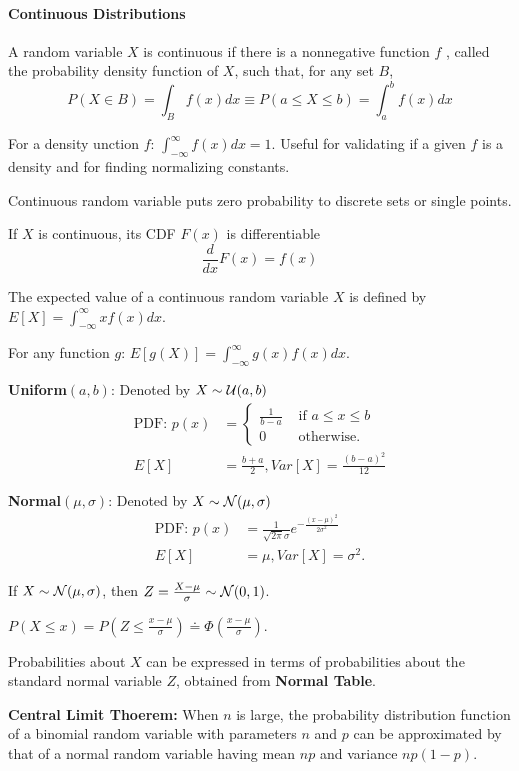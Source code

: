 \documentclass[10pt,twocolumn]{article}
\numberwithin{equation}{section}
\begin{document}
\paragraph{Continuous Distributions}
\ben 
\item A random variable $X$ is continuous if there is a nonnegative function $f$ , called the probability density function of $X$, such that, for any set $B$,
\[
P( X \in B) = \int_B f(x) dx \equiv P(a \le X \le b) = \int_{a}^{b} f(x) dx
\]
\item For a density unction $f$: $\int_{-\infty}^{\infty} f(x) dx = 1$. Useful for validating if a given $f$ is a density and for finding normalizing constants. 
\item Continuous random variable puts zero probability to discrete sets or single points. 
\item If $X$ is continuous, its CDF $F(x)$ is differentiable
\[
\frac{d}{dx}F(x) = f(x) 
\]
\item The expected value of a continuous random variable $X$ is defined by
$E[X] = \int_{-\infty}^{\infty} xf(x) dx$.
\item For any function $g$: $E[g(X)] = \int_{-\infty}^{\infty} g(x) f(x) dx$. 
\item \textbf{Uniform$(a,b)$}: Denoted by $X \sim \mathcal{U}(a,b)$
\begin{align*}
\text{PDF: } p(x) &= \begin{cases} \frac{1}{b-a} &\text{ if } a \le x \le b \\
0 &\text{ otherwise}.
\end{cases} \\
E[X] & = \frac{b+a}{2}, Var[X] = \frac{(b-a)^2}{12} 
\end{align*}
\item \textbf{Normal$(\mu,\sigma)$}: Denoted by $X \sim \mathcal{N}(\mu,\sigma)$
\begin{align*}
\text{PDF: } p(x) &= \frac{1}{\sqrt{2\pi} \sigma} e^{-\frac{(x-\mu)^2}{2\sigma^2}} \\
E[X] & = \mu, Var[X] = \sigma^2. 
\end{align*}
\item If $X \sim \mathcal{N}(\mu,\sigma)$, then $Z = \frac{X-\mu}{\sigma} \sim \mathcal{N}(0,1)$. 
\item $P(X \le x) = P(Z \le \frac{x-\mu}{\sigma}) \doteq \Phi(\frac{x-\mu}{\sigma})$.
\item Probabilities about $X$ can be expressed in terms of probabilities about the standard normal variable $Z$, obtained from \textbf{Normal Table}.
\item \textbf{Central Limit Thoerem:} When $n$ is large, the probability distribution function of a binomial random variable with parameters $n$ and $p$ can be approximated by that of a normal random variable having mean $np$ and variance $np(1 - p)$. 
\een
\end{document}
